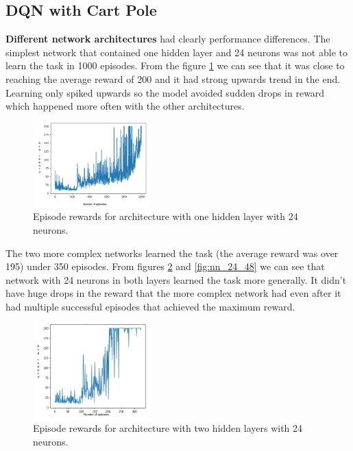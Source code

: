 \subsection{DQN with Cart Pole}
\textbf{Different network architectures} had clearly performance differences. The simplest network that contained one hidden layer and 24 neurons was not able to learn the task in 1000 episodes. From the figure \ref{fig:nn_24} we can see that it was close to reaching the average reward of 200 and it had strong upwards trend in the end. Learning only spiked upwards so the model avoided sudden drops in reward which happened more often with the other architectures.

\begin{figure}[H]
    \centering
    \includegraphics[width=0.4\textwidth]{images/nn_24.png}
    \caption{
    Episode rewards for architecture with one hidden layer with 24 neurons.
    }
    \label{fig:nn_24}
\end{figure}

The two more complex networks learned the task (the average reward was over 195) under 350 episodes. From figures \ref{fig:nn_24_24} and \ref{fig:nn_24_48} we can see that network with 24 neurons in both layers learned the task more generally. It didn't have huge drops in the reward that the more complex network had even after it had multiple successful episodes that achieved the maximum reward.

\begin{figure}[H]
    \centering
    \includegraphics[width=0.4\textwidth]{images/nn_24_24.png}
    \caption{
    Episode rewards for architecture with two hidden layers with 24 neurons.
    }
    \label{fig:nn_24_24}
\end{figure}

